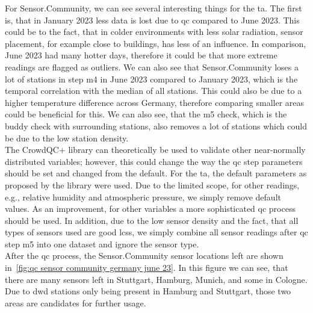 For Sensor.Community, we can see several interesting things for the \gls{ta}. The first is, that in January 2023 less data is lost due to \gls{qc} compared to June 2023. This could be to the fact, that in colder environments with less solar radiation, sensor placement, for example close to buildings, has less of an influence. In comparison, June 2023 had many hotter days, therefore it could be that more extreme readings are flagged as outliers. We can also see that Sensor.Community loses a lot of stations in step m4 in June 2023 compared to January 2023, which is the temporal correlation with the median of all stations. This could also be due to a higher temperature difference across Germany, therefore comparing smaller areas could be beneficial for this. We can also see, that the m5 check, which is the buddy check with surrounding stations, also removes a lot of stations which could be due to the low station density.\\
The CrowdQC+ library can theoretically be used to validate other near-normally distributed variables; however, this could change the way the \gls{qc} step parameters should be set and changed from the default. For the \gls{ta}, the default parameters as proposed by the library were used. Due to the limited scope, for other readings, e.g., relative humidity and atmospheric pressure, we simply remove default values. As an improvement, for other variables a more sophisticated \gls{qc} process should be used. In addition, due to the low sensor density and the fact, that all types of sensors used are good \gls{lcs}s, we simply combine all sensor readings after \gls{qc} step m5 into one dataset and ignore the sensor type.\\
After the \gls{qc} process, the Sensor.Community sensor locations left are shown in~\ref{fig:qc sensor community germany june 23}. In this figure we can see, that there are many sensors left in Stuttgart, Hamburg, Munich, and some in Cologne. Due to \gls{dwd} stations only being present in Hamburg and Stuttgart, those two areas are candidates for further usage.

